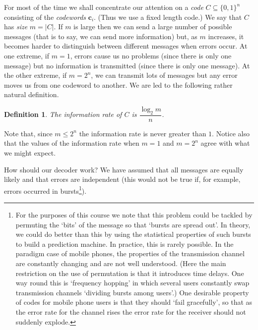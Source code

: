 \documentclass[12pt,a4paper]{article}
\theoremstyle{plain}
\newtheorem{definition}[theorem]{Definition}
\theoremstyle{definition}
\begin{document}
For most of the time we shall concentrate our attention
on a \emph{code} $C\subseteq\{0,1\}^{n}$ consisting
of the \emph{codewords} $\mathbf{c}_{i}$.
(Thus we use a fixed length code.) We say that
$C$ has \emph{size} $m=|C|$. 
If $m$ is large then
we can send a large number of possible messages
(that is to say, we can send more information) but,
as $m$ increases, it becomes harder to distinguish
between different messages when errors occur.
At one extreme, if $m=1$, errors cause us no problems
(since there is only one message) but no information
is transmitted (since there is only one message).
At the other extreme, if $m=2^{n}$, we can transmit
lots of messages but any error moves us from one
codeword to another. We are led to the following
rather natural definition.
\begin{definition}\label{information rate}
The information rate of $C$ is
$\dfrac{\log_{2} m}{n}$.
\end{definition}
Note that, since $m\leq 2^{n}$ the information rate
is never greater than $1$. Notice also that the values of
the information rate when $m=1$ and $m=2^{n}$ agree
with what we might expect.
 
How should our decoder work? We have assumed that
all messages are equally likely and that errors
are independent (this would not be true if, for
example, errors occurred in bursts\footnote{For
the purposes of this course we note
that this problem could
be tackled by permuting the `bits' of the message
so that `bursts are spread out'. In theory, we
could do better than this by using
the statistical properties of such bursts
to build a prediction machine.
In practice, this is rarely possible.
In the paradigm case of mobile phones,
the properties of the transmission channel
are constantly changing and are not well understood.
(Here the main restriction on the use of permutation
is that it introduces time delays. One way round this
is `frequency hopping' in which several users
constantly swap transmission channels `dividing
bursts among users'.) One desirable property of
codes for mobile phone users is that they should
`fail gracefully', so that as the error rate
for the channel rises the error rate for the receiver
should not suddenly explode.}).
\end{document}
